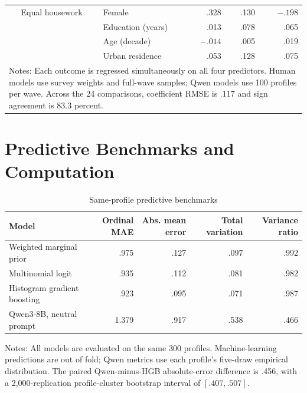 \documentclass[11pt]{article}
\begin{document}
\begin{landscape}
\begin{longtable}{lllrrr}
     & Equal housework & Female & .328 & .130 & $-.198$ \\
     &                 & Education (years) & .013 & .078 & .065 \\
     &                 & Age (decade) & $-.014$ & .005 & .019 \\
     &                 & Urban residence & .053 & .128 & .075 \\
\bottomrule
\multicolumn{6}{p{8.5in}}{\footnotesize Notes: Each outcome is regressed simultaneously on all four
predictors. Human models use survey weights and full-wave samples; Qwen models use 100 profiles per
wave. Across the 24 comparisons, coefficient RMSE is .117 and sign agreement is 83.3 percent.}\\
\end{longtable}
\end{landscape}

\section{Predictive Benchmarks and Computation}

\begin{table}[!htbp]
\centering
\caption{Same-profile predictive benchmarks}
\label{tab:s7-matched}
\begin{threeparttable}
\small
\begin{tabular}{lrrrr}
\toprule
Model & Ordinal MAE & Abs. mean error & Total variation & Variance ratio \\
\midrule
Weighted marginal prior & .975 & .127 & .097 & .992 \\
Multinomial logit & .935 & .112 & .081 & .982 \\
Histogram gradient boosting & .923 & .095 & .071 & .987 \\
Qwen3-8B, neutral prompt & 1.379 & .917 & .538 & .466 \\
\bottomrule
\end{tabular}
\begin{tablenotes}[flushleft]
\footnotesize
\item Notes: All models are evaluated on the same 300 profiles. Machine-learning predictions are
out of fold; Qwen metrics use each profile's five-draw empirical distribution. The paired
Qwen-minus-HGB absolute-error difference is .456, with a 2,000-replication profile-cluster bootstrap
interval of $[.407,.507]$.
\end{tablenotes}
\end{threeparttable}
\end{table}
\end{document}
